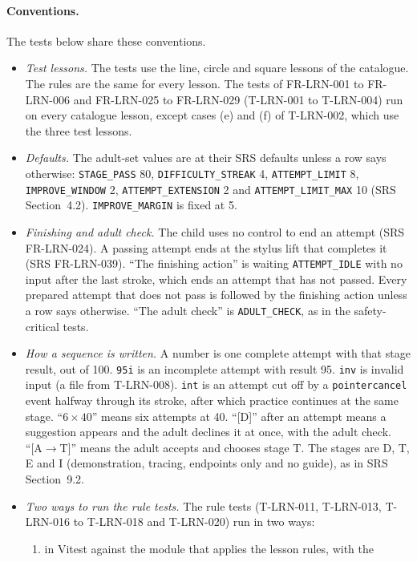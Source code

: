 \documentclass[12pt, titlepage]{article}
\begin{document}
\paragraph{Conventions.} The tests below share these conventions.
\begin{itemize}
\item \emph{Test lessons.} The tests use the line, circle and square
lessons of the catalogue. The rules are the same for every lesson. The
tests of FR-LRN-001 to FR-LRN-006 and FR-LRN-025 to FR-LRN-029 (T-LRN-001 to
T-LRN-004) run on every
catalogue lesson, except cases (e) and (f) of T-LRN-002, which use the
three test lessons.
\item \emph{Defaults.} The adult-set values are at their SRS defaults
unless a row says otherwise: \texttt{STAGE\_PASS} 80,
\texttt{DIFFICULTY\_STREAK} 4, \texttt{ATTEMPT\_LIMIT} 8,
\texttt{IMPROVE\_WINDOW} 2, \texttt{ATTEMPT\_EXTENSION} 2 and
\texttt{ATTEMPT\_LIMIT\_MAX} 10 (SRS Section~4.2).
\texttt{IMPROVE\_MARGIN} is fixed at 5.
\item \emph{Finishing and adult check.} The child uses no control to end an
attempt (SRS FR-LRN-024). A passing attempt ends at the stylus lift that
completes it (SRS FR-LRN-039). ``The finishing action'' is waiting \texttt{ATTEMPT\_IDLE}
with no input after the last stroke, which ends an attempt that has not
passed. Every prepared attempt that does not pass is followed by the
finishing action unless a row says otherwise. ``The adult check'' is \texttt{ADULT\_CHECK}, as in the
safety-critical tests.
\item \emph{How a sequence is written.} A number is one complete attempt
with that stage result, out of 100. \texttt{95i} is an incomplete attempt
with result 95. \texttt{inv} is invalid input (a file from T-LRN-008).
\texttt{int} is an attempt cut off by a \texttt{pointercancel} event
halfway through its stroke, after which practice continues at the same
stage. ``$6 \times 40$'' means six attempts at 40. ``[D]'' after an attempt
means a suggestion appears and the adult declines it at once, with the
adult check. ``[A$\to$T]'' means the adult accepts and chooses stage T. The
stages are D, T, E and I (demonstration, tracing, endpoints only and no
guide), as in SRS Section~9.2.
\item \emph{Two ways to run the rule tests.} The rule tests (T-LRN-011,
T-LRN-013, T-LRN-016 to T-LRN-018 and T-LRN-020) run in two ways:
\begin{enumerate}
\item in Vitest against the module that applies the lesson rules, with the

\end{enumerate}
\end{itemize}
\end{document}
